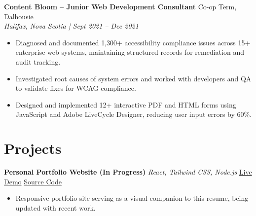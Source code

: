 \documentclass[11pt, letterpaper]{article}
\newenvironment{highlights}{
    \begin{itemize}[
        topsep=0.10 cm,
        parsep=0.10 cm,
        partopsep=0pt,
        itemsep=0pt,
        leftmargin=0.4 cm]}
        {\end{itemize}}
\begin{document}
    \textbf{Content Bloom – Junior Web Development Consultant} \hfill Co-op Term, Dalhousie
    \vspace{0.5mm}\\
    \textit{Halifax, Nova Scotia | Sept 2021 – Dec 2021}
    \begin{highlights}
        \item Diagnosed and documented 1,300+ accessibility compliance issues across 15+ enterprise web systems, maintaining structured records for remediation and audit tracking.
        \item Investigated root causes of system errors and worked with developers and QA to validate fixes for WCAG compliance.
        \item Designed and implemented 12+ interactive PDF and HTML forms using JavaScript and Adobe LiveCycle Designer, reducing user input errors by 60\%.
    \end{highlights}

    \section{Projects}

    \textbf{Personal Portfolio Website (In Progress)} \hfill \textit{React, Tailwind CSS, Node.js} 
    \textbar{} \href{https://aitzazqadir.dev}{Live Demo}
    \textbar{} \href{https://github.com/aitzaz-qadir/portfolio-website}{Source Code}
    \begin{highlights}
        \item Responsive portfolio site serving as a visual companion to this resume, being updated with recent work.
    \end{highlights}
\end{document}
